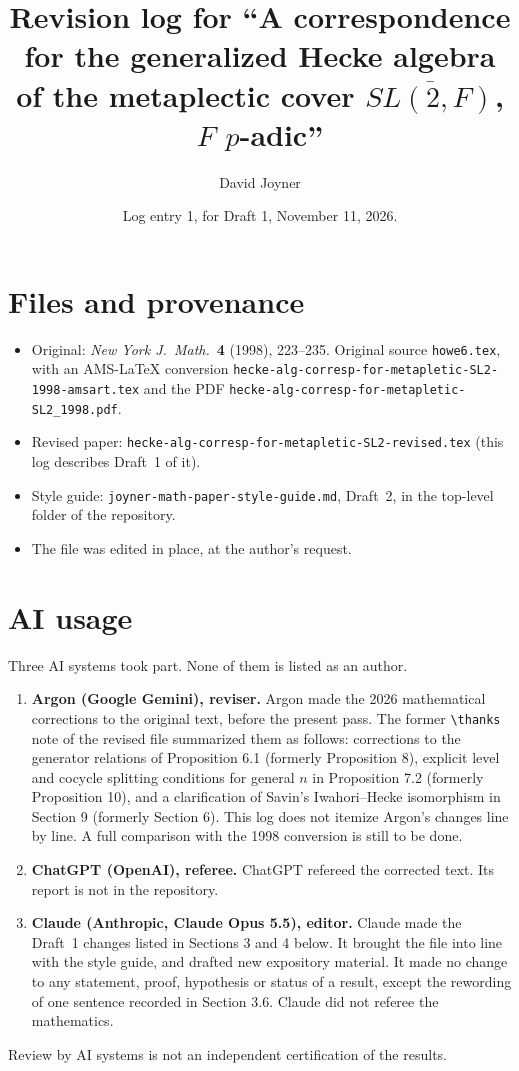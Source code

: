\documentclass[12pt,letterpaper]{amsart}
\title{Revision log for ``A correspondence for the generalized Hecke algebra
of the metaplectic cover $\overline{SL(2,F)}$, $F$ $p$-adic''}
\author{David Joyner}
\date{Log entry 1, for Draft 1, November 11, 2026.}
\begin{document}
\maketitle

\section{Files and provenance}

\begin{itemize}
\item Original: \emph{New York J.\ Math.}\ \textbf{4} (1998), 223--235.
Original source \texttt{howe6.tex}, with an AMS-\LaTeX{} conversion
\texttt{hecke-alg-corresp-for-metapletic-SL2-1998-amsart.tex} and the PDF
\texttt{hecke-alg-corresp-for-metapletic-SL2\_1998.pdf}.
\item Revised paper: \texttt{hecke-alg-corresp-for-metapletic-SL2-revised.tex}
(this log describes Draft~1 of it).
\item Style guide: \texttt{joyner-math-paper-style-guide.md}, Draft~2, in the
top-level folder of the repository.
\item The file was edited in place, at the author's request.
\end{itemize}

\section{AI usage}

Three AI systems took part. None of them is listed as an author.
\begin{enumerate}
\item \textbf{Argon (Google Gemini), reviser.} Argon made the 2026
mathematical corrections to the original text, before the present pass. The
former \verb|\thanks| note of the revised file summarized them as follows:
corrections to the generator relations of Proposition 6.1 (formerly
Proposition 8), explicit level and cocycle splitting conditions for general
$n$ in Proposition 7.2 (formerly Proposition 10), and a clarification of
Savin's Iwahori--Hecke isomorphism in Section 9 (formerly Section 6). This
log does not itemize Argon's changes line by line. A full comparison with the
1998 conversion is still to be done.
\item \textbf{ChatGPT (OpenAI), referee.} ChatGPT refereed the corrected
text. Its report is not in the repository.
\item \textbf{Claude (Anthropic, Claude Opus 5.5), editor.} Claude made the
Draft~1 changes listed in Sections 3 and 4 below. It brought the file into
line with the style guide, and drafted new expository material. It made no
change to any statement, proof, hypothesis or status of a result, except the
rewording of one sentence recorded in Section 3.6. Claude did not referee the
mathematics.
\end{enumerate}
Review by AI systems is not an independent certification of the results.
\end{document}
